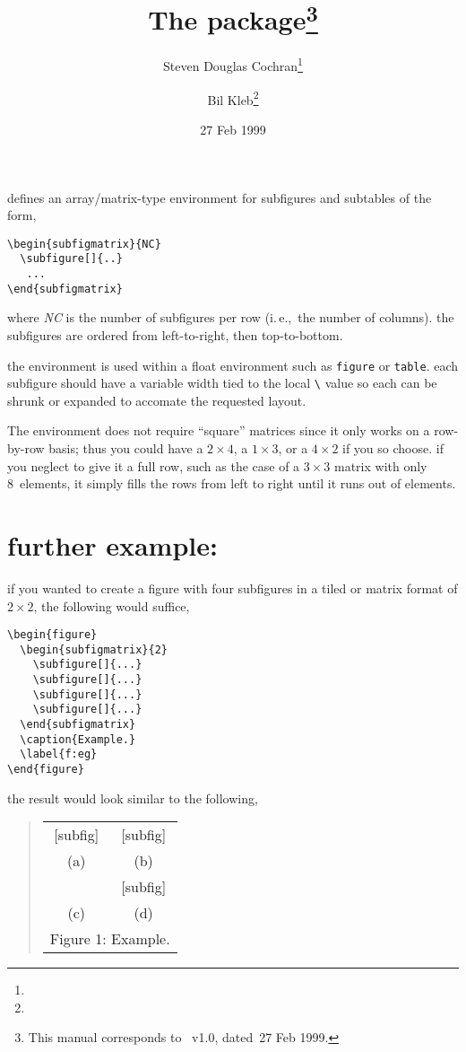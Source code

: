 \documentclass[pagesize=auto, fontsize=12pt, DIV=10, headings=normal]{scrartcl}
\title{The \pkg{subfigmat} package\thanks{This manual corresponds to \pkg{subfigmat.sty}~v1.0, dated~27 Feb 1999.}}
\author{%
  Steven Douglas Cochran\thanks{\mail{sdc+@cs.cmu.edu}}%
  \and Bil Kleb\thanks{\mail{w.l.kleb@larc.nasa.gov}}%
}
\date{27 Feb 1999}
\makeatletter
\newcommand*{\cs}[1]{\texttt{\textbackslash#1}}
\newcommand*{\cmd}[1]{\cs{\expandafter\@gobble\string#1}}
\newcommand*{\env}[1]{\texttt{#1}}
\newcommand*{\meta}[1]{\textlangle\textsl{#1}\textrangle}
\makeatother
\begin{document}
\maketitle

\noindent
defines an array/matrix-type environment for subfigures and
subtables of the form,
%
\begin{lstlisting}
\begin{subfigmatrix}{NC}
  \subfigure[]{..}
   ...
\end{subfigmatrix}
\end{lstlisting}
%
where \meta{NC} is the number of subfigures per row (i.\,e.,\ the
number of columns).  the subfigures are ordered from
left-to-right, then top-to-bottom.

the environment is used within a float environment such as
\env{figure} or \env{table}.  each subfigure should have a variable width
tied to the local \cmd{\linewidth} value so each can be shrunk or
expanded to accomate the requested layout.

The environment does not require ``square'' matrices since it
only works on a row-by-row basis; thus you could have a $2 \times 4$,
a $1 \times 3$, or a $4 \times 2$ if you so choose.  if you neglect to give
it a full row, such as the case of a $3 \times 3$ matrix with only
8~elements, it simply fills the rows from left to right until
it runs out of elements.


\section{further example:}

if you wanted to create a figure with four subfigures in a tiled
or matrix format of $2 \times 2$, the following would suffice,
%
\begin{lstlisting}
\begin{figure}
  \begin{subfigmatrix}{2}
    \subfigure[]{...}
    \subfigure[]{...}
    \subfigure[]{...}
    \subfigure[]{...}
  \end{subfigmatrix}
  \caption{Example.}
  \label{f:eg}
\end{figure}
\end{lstlisting}
%
the result would look similar to the following,
%
\begin{quote}
  \begin{tabular}{@{\quad}c@{\quad}c@{\quad}}
    [subfig] & [subfig] \\
    (a)      & (b)      \\[2ex]
    [subfig] & [subfig] \\
    (c)      & (d)      \\[2ex]
    \multicolumn{2}{c}{Figure 1: Example.}
  \end{tabular}
\end{quote}
\end{document}
